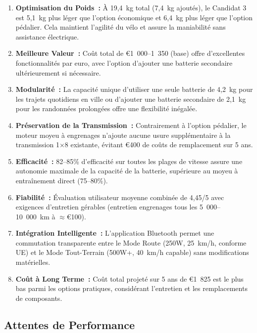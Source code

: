 \documentclass[12pt,a4paper]{article}
\begin{document}
\begin{enumerate}
    \item \textbf{Optimisation du Poids~:} À 19,4~kg total (7,4~kg ajoutés), le Candidat 3 est 5,1~kg plus léger que l'option économique et 6,4~kg plus léger que l'option pédalier. Cela maintient l'agilité du vélo et assure la maniabilité sans assistance électrique.
    
    \item \textbf{Meilleure Valeur~:} Coût total de €1~000--1~350 (base) offre d'excellentes fonctionnalités par euro, avec l'option d'ajouter une batterie secondaire ultérieurement si nécessaire.
    
    \item \textbf{Modularité~:} La capacité unique d'utiliser une seule batterie de 4,2~kg pour les trajets quotidiens en ville ou d'ajouter une batterie secondaire de 2,1~kg pour les randonnées prolongées offre une flexibilité inégalée.
    
    \item \textbf{Préservation de la Transmission~:} Contrairement à l'option pédalier, le moteur moyeu à engrenages n'ajoute aucune usure supplémentaire à la transmission 1×8 existante, évitant €400 de coûts de remplacement sur 5 ans.
    
    \item \textbf{Efficacité~:} 82--85\% d'efficacité sur toutes les plages de vitesse assure une autonomie maximale de la capacité de la batterie, supérieure au moyeu à entraînement direct (75--80\%).
    
    \item \textbf{Fiabilité~:} Évaluation utilisateur moyenne combinée de 4,45/5 avec exigences d'entretien gérables (entretien engrenages tous les 5~000--10~000~km à $\approx$€100).
    
    \item \textbf{Intégration Intelligente~:} L'application Bluetooth permet une commutation transparente entre le Mode Route (250W, 25~km/h, conforme UE) et le Mode Tout-Terrain (500W+, 40~km/h capable) sans modifications matérielles.
    
    \item \textbf{Coût à Long Terme~:} Coût total projeté sur 5 ans de €1~825 est le plus bas parmi les options pratiques, considérant l'entretien et les remplacements de composants.
\end{enumerate}

\subsection{Attentes de Performance}
\end{document}
